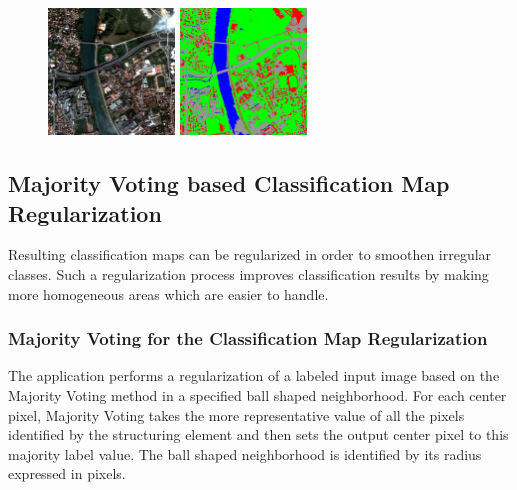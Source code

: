 \begin{figure}[!h]
  \center
  \includegraphics[width=0.3\textwidth]{../Art/MonteverdiImages/classification_chain_inputimage.jpg}
  \includegraphics[width=0.3\textwidth]{../Art/MonteverdiImages/classification_chain_fancyclassif_CMR_Fusion_123.png}
  \label{fig:ClassificationMapFusionApplication2}
\end{figure}







\subsection{Majority Voting based Classification Map Regularization}\label{ssec:classificationmapregularization}

Resulting classification maps can be regularized in order to smoothen irregular classes. Such a regularization process
improves classification results by making more homogeneous areas which are easier to handle.

\subsubsection{Majority Voting for the Classification Map Regularization}

The  application performs a regularization of a labeled input image
based on the Majority Voting method in a specified ball shaped neighborhood. For each center pixel, Majority Voting takes the
more representative value of all the pixels identified by the structuring element and then sets the output center pixel
to this majority label value. The ball shaped neighborhood is identified by its radius expressed in pixels.


